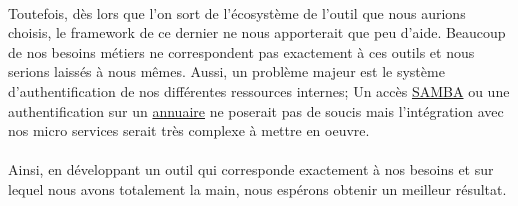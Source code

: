     \paragraph{}
    Toutefois, dès lors que l'on sort de l'écosystème de l'outil que nous aurions choisis, le framework de ce dernier ne nous apporterait que peu d'aide.
    Beaucoup de nos besoins métiers ne correspondent pas exactement à ces outils et nous serions laissés à nous mêmes.
    Aussi, un problème majeur est le système d'authentification de nos différentes ressources internes;
    Un accès \href{https://fr.wikipedia.org/wiki/Samba_(informatique)}{SAMBA} ou
    une authentification sur un \href{https://fr.wikipedia.org/wiki/Annuaire}{annuaire} ne poserait pas de soucis
    mais l'intégration avec nos micro services serait très complexe à mettre en oeuvre.

    \paragraph{}
    Ainsi, en développant un outil qui corresponde exactement à nos besoins et sur lequel nous avons totalement la main, nous espérons obtenir un meilleur résultat.
